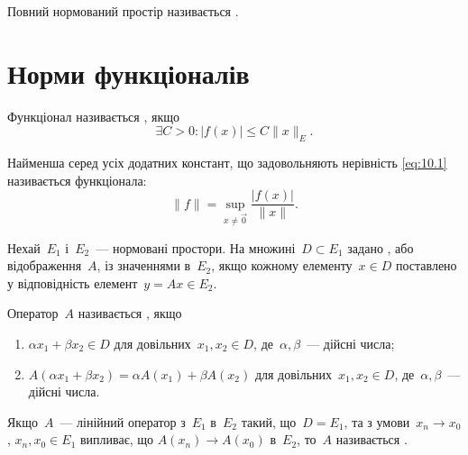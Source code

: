 \begin{definition}
Повний нормований простір називається .
\end{definition}

\section{Норми функціоналів}

\begin{definition}
Функціонал називається , якщо
\begin{equation}
    \label{eq:10.1}    
    \exists C > 0: |f(x)| \le C \|x\|_E.
\end{equation}
\end{definition}

\begin{definition}
Найменша серед усіх додатних констант, що
задовольняють нерівність \eqref{eq:10.1} називається 
функціонала:
\begin{equation*}
    \|f\| = \sup_{x \ne \vec 0} \frac{|f(x)|}{\|x\|}.
\end{equation*}
\end{definition}

\begin{definition}
Нехай~$E_1$ і~$E_2$~--- нормовані простори. На
множині~$D \subset E_1$ задано , або відображення~$A$, із
значеннями в~$E_2$, якщо кожному елементу~$x \in D$
поставлено у відповідність елемент~$y = A x \in E_2$.
\end{definition}

\begin{definition}
Оператор~$A$ називається , якщо
\begin{enumerate}
    \item $\alpha x_1 + \beta x_2 \in D$
    для довільних~$x_1, x_2 \in D$,
    де~$\alpha, \beta$~--- дійсні числа;
    \item $A(\alpha x_1 + \beta x_2) = \alpha A(x_1) + \beta A(x_2)$
    для довільних~$x_1, x_2 \in D$,
    де~$\alpha, \beta$~--- дійсні числа.
\end{enumerate}
\end{definition}

\begin{definition}
Якщо~$A$~--- лінійний оператор з~$E_1$ в~$E_2$ такий,
що~$D = E_1$, та з умови~$x_n \to x_0$, $x_n, x_0 \in E_1$ випливає, що
$A(x_n) \to A(x_0)$ в~$E_2$, то~$A$ називається .
\end{definition}

